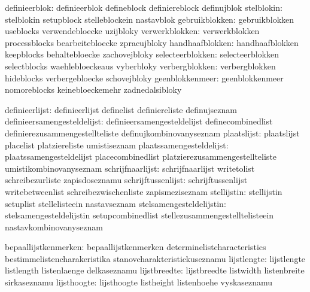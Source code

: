                 definieerblok:  definieerblok                defineblock
                                definiereblock               definujblok
                   stelblokin:  stelblokin                   setupblock
                                stelleblockein               nastavblok
               gebruikblokken:  gebruikblokken               useblocks
                                verwendebloecke              uzijbloky
               verwerkblokken:  verwerkblokken               processblocks
                                bearbeitebloecke             zpracujbloky
              handhaafblokken:  handhaafblokken              keepblocks
                                behaltebloecke               zachovejbloky
             selecteerblokken:  selecteerblokken             selectblocks
                                waehlebloeckeaus             vyberbloky
               verbergblokken:  verbergblokken               hideblocks
                                verbergebloecke              schovejbloky
              geenblokkenmeer:  geenblokkenmeer              nomoreblocks
                                keinebloeckemehr             zadnedalsibloky

               definieerlijst:  definieerlijst               definelist
                                definiereliste               definujseznam
  definieersamengesteldelijst:  definieersamengesteldelijst  definecombinedlist
                                definierezusammengestellteliste definujkombinovanyseznam
                  plaatslijst:  plaatslijst                  placelist
                                platziereliste               umistiseznam
     plaatssamengesteldelijst:  plaatssamengesteldelijst     placecombinedlist
                                platzierezusammengestellteliste umistikombinovanyseznam
             schrijfnaarlijst:  schrijfnaarlijst             writetolist
                                schreibezurliste             zapisdoseznamu
           schrijftussenlijst:  schrijftussenlijst           writebetweenlist
                                schreibezwischenliste        zapismeziseznam
                  stellijstin:  stellijstin                  setuplist
                                stellelisteein               nastavseznam
     stelsamengesteldelijstin:  stelsamengesteldelijstin     setupcombinedlist
                                stellezusammengestelltelisteein nastavkombinovanyseznam

         bepaallijstkenmerken:  bepaallijstkenmerken         determinelistcharacteristics
                                bestimmelistencharakeristika stanovcharakteristickuseznamu
                  lijstlengte:  lijstlengte                  listlength
                                listenlaenge                 delkaseznamu
                 lijstbreedte:  lijstbreedte                 listwidth
                                listenbreite                 sirkaseznamu
                  lijsthoogte:  lijsthoogte                  listheight
                                listenhoehe                  vyskaseznamu

